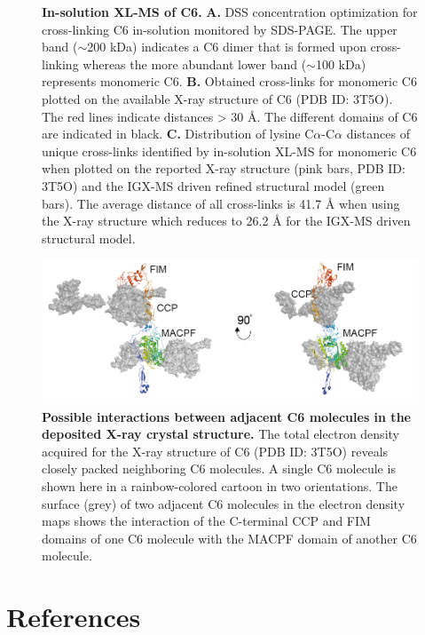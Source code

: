 \begin{subappendices}
\begin{figure}[hbt]
		\caption{\textbf{In-solution XL-MS of C6.} \textbf{A.} DSS concentration optimization for cross-linking C6 in-solution monitored by SDS-PAGE. The upper band ($\sim$200 kDa) indicates a C6 dimer that is formed upon cross-linking whereas the more abundant lower band ($\sim$100 kDa) represents monomeric C6. \textbf{B.} Obtained cross-links for monomeric C6 plotted on the available X-ray structure of C6 (PDB ID: 3T5O). The red lines indicate distances > 30 Å. The different domains of C6 are indicated in black. \textbf{C.} Distribution of lysine C$\alpha$-C$\alpha$ distances of unique cross-links identified by in-solution XL-MS for monomeric C6 when plotted on the reported X-ray structure (pink bars, PDB ID: 3T5O) and the IGX-MS driven refined structural model (green bars). The average distance of all cross-links is 41.7 Å when using the X-ray structure which reduces to 26.2 Å for the IGX-MS driven structural model.}
		\label{fig:ch2_app_fig9}
	\end{figure}
	\begin{figure}[hbt]
		\center
		\includegraphics[]{Chapter.2/Figures/SI_Figure7.png}
		\caption{\textbf{Possible interactions between adjacent C6 molecules in the deposited X-ray crystal structure.} The total electron density acquired for the X-ray structure of C6 (PDB ID: 3T5O) reveals closely packed neighboring C6 molecules. A single C6 molecule is shown here in a rainbow-colored cartoon in two orientations. The surface (grey) of two adjacent C6 molecules in the electron density maps shows the interaction of the C-terminal CCP and FIM domains of one C6 molecule with the MACPF domain of another C6 molecule.}
		\label{fig:ch2_app_fig10}
	\end{figure}
\end{subappendices}
%
\clearpage
\section*{References}

